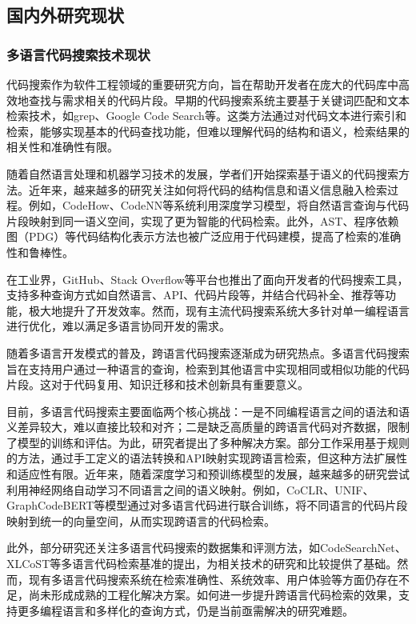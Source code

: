 \documentclass[UTF8,a4paper,12pt]{ctexart}
\numberwithin{equation}{section}
\begin{document}
\subsection{国内外研究现状}
\subsubsection{多语言代码搜索技术现状}
代码搜索作为软件工程领域的重要研究方向，旨在帮助开发者在庞大的代码库中高效地查找与需求相关的代码片段。早期的代码搜索系统主要基于关键词匹配和文本检索技术，如grep、Google Code Search等。这类方法通过对代码文本进行索引和检索，能够实现基本的代码查找功能，但难以理解代码的结构和语义，检索结果的相关性和准确性有限。\par
随着自然语言处理和机器学习技术的发展，学者们开始探索基于语义的代码搜索方法。近年来，越来越多的研究关注如何将代码的结构信息和语义信息融入检索过程。例如，CodeHow\cite{ref1}、CodeNN\cite{ref2}等系统利用深度学习模型，将自然语言查询与代码片段映射到同一语义空间，实现了更为智能的代码检索。此外，AST、程序依赖图（PDG）等代码结构化表示方法也被广泛应用于代码建模，提高了检索的准确性和鲁棒性。\par
在工业界，GitHub、Stack Overflow等平台也推出了面向开发者的代码搜索工具，支持多种查询方式如自然语言、API、代码片段等，并结合代码补全、推荐等功能，极大地提升了开发效率。然而，现有主流代码搜索系统大多针对单一编程语言进行优化，难以满足多语言协同开发的需求。\par
随着多语言开发模式的普及，跨语言代码搜索逐渐成为研究热点。多语言代码搜索旨在支持用户通过一种语言的查询，检索到其他语言中实现相同或相似功能的代码片段。这对于代码复用、知识迁移和技术创新具有重要意义。\par
目前，多语言代码搜索主要面临两个核心挑战：一是不同编程语言之间的语法和语义差异较大，难以直接比较和对齐；二是缺乏高质量的跨语言代码对齐数据，限制了模型的训练和评估。为此，研究者提出了多种解决方案。部分工作采用基于规则的方法，通过手工定义的语法转换和API映射实现跨语言检索，但这种方法扩展性和适应性有限。近年来，随着深度学习和预训练模型的发展，越来越多的研究尝试利用神经网络自动学习不同语言之间的语义映射。例如，CoCLR\cite{ref3}、UNIF\cite{ref4}、GraphCodeBERT\cite{ref5}等模型通过对多语言代码进行联合训练，将不同语言的代码片段映射到统一的向量空间，从而实现跨语言的代码检索。\par
此外，部分研究还关注多语言代码搜索的数据集和评测方法，如CodeSearchNet\cite{ref6}、XLCoST\cite{ref7}等多语言代码检索基准的提出，为相关技术的研究和比较提供了基础。然而，现有多语言代码搜索系统在检索准确性、系统效率、用户体验等方面仍存在不足，尚未形成成熟的工程化解决方案。如何进一步提升跨语言代码检索的效果，支持更多编程语言和多样化的查询方式，仍是当前亟需解决的研究难题。
\end{document}
